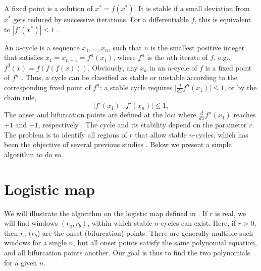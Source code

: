 \documentclass{ws-ijbc}
\begin{document}
A fixed point is a solution of $x^* = f(x^*)$.
%
It is stable if a small deviation from $x^*$
  gets reduced by successive iterations.
%
For a differentiable $f$,
  this is equivalent to $|f'(x^*)| \le 1$
  \cite{strogatz}.


An $n$-cycle is a sequence $x_1, \dots, x_n$,
  such that $n$ is the smallest positive integer
  that satisfies $x_1 = x_{n+1} = f^n(x_1)$,
  where $f^n$ is the $n$th iterate of $f$,
  e.g., $f^3(x) = f(f(f(x)))$.
Obviously, any $x_k$ in an $n$-cycle of $f$ is a fixed point of $f^n$
%
\big[but the converse is untrue, for a fixed point of $f^n$
  can also be a fixed point of $f^d$ for a divisor $d$ of $n$:
  if $f^d(x) = x$, then $f^n(x) = f^d(\cdots f^d(x)\cdots) = x$\big].
%
%
Thus, a cycle can be classified as stable or unstable
  according to the corresponding fixed point of $f^n$:
  a stable cycle requires
  $\big| \frac {d} {dx} f^n(x_1) \big| \le 1$,
  or by the chain rule,
%
%
%
\begin{equation}
  \Big| f'(x_1) \cdots f'(x_n) \Big| \le 1,
\label{eq:der}
\end{equation}
%
%
The onset and bifurcation points
  are defined at the loci
  where $\frac {d} {dx} f^n(x_1)$ reaches $+1$ and $-1$,
  respectively \cite{strogatz}.
%
%
%
The cycle and its stability depend on the parameter $r$.
%
The problem is to identify
  all regions of $r$ that allow stable $n$-cycles,
  which has been the objective of several previous
  studies
  \cite{brown1, brown2, stephenson1, stephenson2, stephenson3,
  saha, bechhoefer, gordon, burm, zhang, bailey1, bailey2, kk1, lewis}.
Below we present a simple algorithm to do so.









\section{\label{sec:logmap}Logistic map}


We will illustrate the algorithm on the logistic map \cite{may, strogatz}
  defined in .
If $r$ is real,
  we will find windows $(r_a, r_b)$,
    within which stable $n$-cycles can exist.
%
Here, if $r > 0$, then
  $r_a$ ($r_b$) are the onset (bifurcation) points.
%
There are generally multiple such windows for a single $n$,
  but all onset points satisfy the same polynomial equation,
  and all bifurcation points another.
%
Our goal is thus to find the two polynomials for a given $n$.
\end{document}

